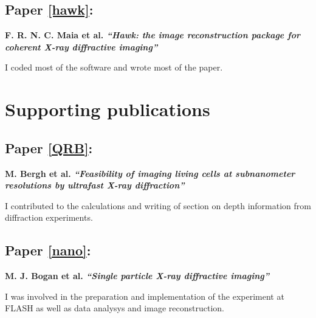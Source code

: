 \clearpage

\subsection*{Paper \ref{hawk}:}{\bf F. R. N. C. Maia et al. {\em ``Hawk: the image reconstruction package for coherent X-ray diffractive
      imaging''}}

\noindent I coded most of the software and wrote most of the paper.

\section*{Supporting publications}

\vspace{1cm}

\subsection*{Paper \ref{QRB}:}{\bf M. Bergh et al. {\em ``Feasibility of imaging living cells at subnanometer resolutions by ultrafast X-ray diffraction'' }}

\noindent I contributed to the calculations and writing of section on depth information from diffraction
experiments.
\subsection*{Paper \ref{nano}:}{\bf M. J. Bogan et al. {\em ``Single particle X-ray diffractive imaging''}}

\noindent I was involved in the preparation and implementation of the experiment
at FLASH as well as data analysys and image reconstruction.

